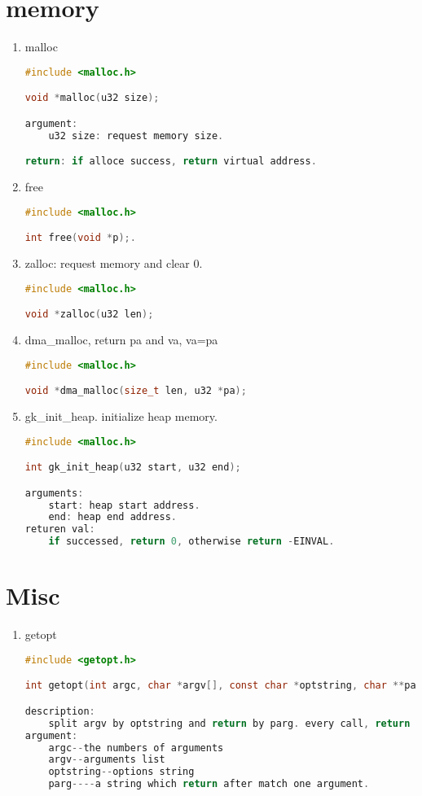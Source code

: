 \section{memory}
\begin{enumerate}
\item malloc
\begin{lstlisting}[language=c, numbers=none]
#include <malloc.h>

void *malloc(u32 size);

argument:
	u32 size: request memory size.

return: if alloce success, return virtual address.
\end{lstlisting}
\item free
\begin{lstlisting}[language=c, numbers=none]
#include <malloc.h>

int free(void *p);.
\end{lstlisting}
\item zalloc: request memory and clear 0.
\begin{lstlisting}[language=c, numbers=none]
#include <malloc.h>

void *zalloc(u32 len);
\end{lstlisting}
\item dma\_malloc, return pa and va, va=pa
\begin{lstlisting}[language=c, numbers=none]
#include <malloc.h>

void *dma_malloc(size_t len, u32 *pa);
\end{lstlisting}
\item gk\_init\_heap. initialize heap memory.
\begin{lstlisting}[language=c, numbers=none]
#include <malloc.h>

int gk_init_heap(u32 start, u32 end);

arguments:
	start: heap start address.
	end: heap end address.
returen val:
	if successed, return 0, otherwise return -EINVAL.
\end{lstlisting}
\end{enumerate}

\section{Misc}
\begin{enumerate}
\item getopt
\begin{lstlisting}[language=c, numbers=none]
#include <getopt.h>

int getopt(int argc, char *argv[], const char *optstring, char **parg);

description:
	split argv by optstring and return by parg. every call, return a value.
argument:
	argc--the numbers of arguments
	argv--arguments list
	optstring--options string
	parg----a string which return after match one argument.
\end{lstlisting}
\end{enumerate}
